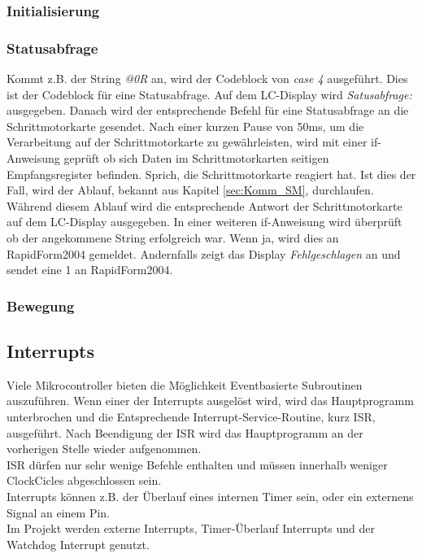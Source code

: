 \subsubsection{Initialisierung}

\subsubsection{Statusabfrage}
Kommt z.B. der String \emph{@0R} an, wird der Codeblock von \emph{case 4} ausgeführt. Dies ist der Codeblock für eine Statusabfrage. Auf dem LC-Display wird \emph{Satusabfrage:} ausgegeben. Danach wird der entsprechende Befehl für eine Statusabfrage an die Schrittmotorkarte gesendet. Nach einer kurzen Pause von 50ms, um die Verarbeitung auf der Schrittmotorkarte zu gewährleisten, wird mit einer if-Anweisung geprüft ob sich Daten im Schrittmotorkarten seitigen Empfangsregister befinden. Sprich, die Schrittmotorkarte reagiert hat. Ist dies der Fall, wird der Ablauf, bekannt aus Kapitel \ref{sec:Komm_SM}, durchlaufen. Während diesem Ablauf wird die entsprechende Antwort der Schrittmotorkarte auf dem LC-Display ausgegeben. In einer weiteren if-Anweisung wird überprüft ob der angekommene String erfolgreich war. Wenn ja, wird dies an RapidForm2004 gemeldet. Andernfalls zeigt das Display \emph{Fehlgeschlagen} an und sendet eine 1 an RapidForm2004.\\


\subsubsection{Bewegung}

\lstset{language=C, basicstyle=\footnotesize, showstringspaces=false, tabsize=8}



\subsection{Interrupts}
\label{sec:Interrupts}
Viele Mikrocontroller bieten die Möglichkeit Eventbasierte Subroutinen auszuführen. Wenn einer der Interrupts ausgelöst wird, wird das Hauptprogramm unterbrochen und die Entsprechende Interrupt-Service-Routine, kurz ISR, ausgeführt. Nach Beendigung der ISR wird das Hauptprogramm an der  vorherigen Stelle wieder aufgenommen.\\
ISR dürfen nur sehr wenige Befehle enthalten und müssen innerhalb weniger ClockCicles abgeschlossen sein. \\
Interrupts können z.B. der Überlauf eines internen Timer sein, oder ein externens Signal an einem Pin.\\
Im Projekt werden externe Interrupts, Timer-Überlauf Interrupts und der Watchdog Interrupt genutzt. 
